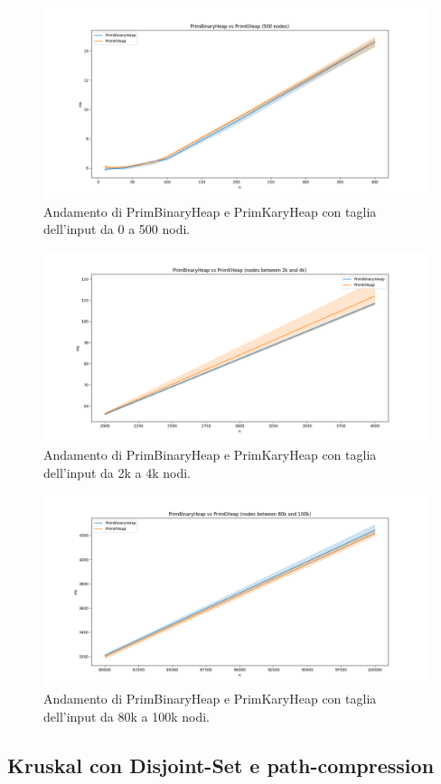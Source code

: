 \begin{figure}[H]
    \centering
    \includegraphics[width=1.0\textwidth]{./images/PrimBinaryHeap_vs_PrimKHeap_(500_nodes).png}
	\caption{Andamento di PrimBinaryHeap e PrimKaryHeap con taglia dell'input da 0 a 500 nodi.}
    \label{fig:Prim2vsPrim4-500}
\end{figure}

\begin{figure}[H]
    \centering
    \includegraphics[width=1.0\textwidth]{./images/PrimBinaryHeap_vs_PrimKHeap_(nodes_between_2k_and_4k).png}
	\caption{Andamento di PrimBinaryHeap e PrimKaryHeap con taglia dell'input da 2k a 4k nodi.}
    \label{fig:Prim2vsPrim4-500}
\end{figure}

\begin{figure}[H]
    \centering
    \includegraphics[width=1.0\textwidth]{./images/PrimBinaryHeap_vs_PrimKHeap_(nodes_between_80k_and_100k).png}
	\caption{Andamento di PrimBinaryHeap e PrimKaryHeap con taglia dell'input da 80k a 100k nodi.}
    \label{fig:Prim2vsPrim4-80k-100k}
\end{figure}

\subsection{Kruskal con Disjoint-Set e path-compression}

